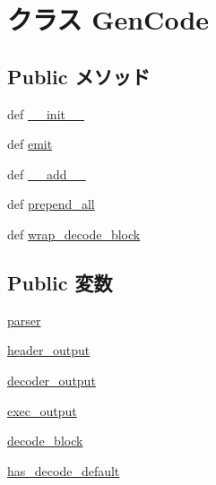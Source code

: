\hypertarget{classisa__parser_1_1GenCode}{
\section{クラス GenCode}
\label{classisa__parser_1_1GenCode}
}
\subsection*{Public メソッド}
\begin{DoxyCompactItemize}
\item 
def \hyperlink{classisa__parser_1_1GenCode_ac775ee34451fdfa742b318538164070e}{\_\-\_\-init\_\-\_\-}
\item 
def \hyperlink{classisa__parser_1_1GenCode_a3b03091a972a5483895c3624c9118f35}{emit}
\item 
def \hyperlink{classisa__parser_1_1GenCode_ae92943b217d29a45ddcbbba2f7208afc}{\_\-\_\-add\_\-\_\-}
\item 
def \hyperlink{classisa__parser_1_1GenCode_a19d74bb433930fe364a5f156a7a12d4d}{prepend\_\-all}
\item 
def \hyperlink{classisa__parser_1_1GenCode_a503ce91498f135d34c2ead9c4a370b65}{wrap\_\-decode\_\-block}
\end{DoxyCompactItemize}
\subsection*{Public 変数}
\begin{DoxyCompactItemize}
\item 
\hyperlink{classisa__parser_1_1GenCode_a90eee7a4677ca8b1ed116364a24367f9}{parser}
\item 
\hyperlink{classisa__parser_1_1GenCode_a7f8b4c47ed50778444850c0dd4dcf855}{header\_\-output}
\item 
\hyperlink{classisa__parser_1_1GenCode_a2f0ce9ffc73bfeb2b38ad0434f9c8885}{decoder\_\-output}
\item 
\hyperlink{classisa__parser_1_1GenCode_a563eb2654ec915589d2c514b8874dd4f}{exec\_\-output}
\item 
\hyperlink{classisa__parser_1_1GenCode_ada980d275b177d0edd8786277f05bbc3}{decode\_\-block}
\item 
\hyperlink{classisa__parser_1_1GenCode_a59278861e3bc1f4347baf828bb7f09c6}{has\_\-decode\_\-default}
\end{DoxyCompactItemize}


